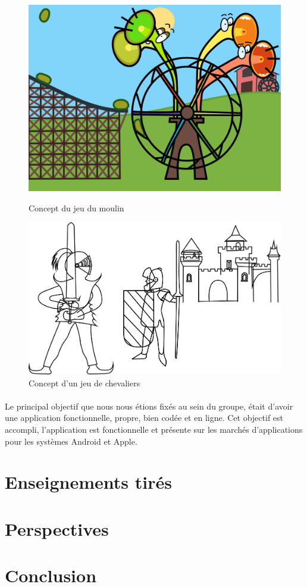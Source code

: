 \begin{figure}[H]\centering
   \begin{minipage}{0.49\textwidth}\centering
     \includegraphics[scale=0.1]{./img/concept_moulin.png}
     \caption{Concept du jeu du moulin}
     \label{jeu_concept1}
   \end{minipage}
   \begin {minipage}{0.49\textwidth}\centering
     \includegraphics[scale=0.1]{./img/concept_chevalier.png}
     \caption{Concept d'un jeu de chevaliers}
     \label{jeu_concept2}
   \end{minipage}
\end{figure}

\paragraph{}
Le principal objectif que nous nous étions fixés au sein du groupe, était d'avoir une application fonctionnelle, propre, bien codée et en ligne. Cet objectif est accompli, l'application est fonctionnelle et présente sur les marchés d'applications pour les systèmes Android et Apple.

\section{Enseignements tirés}


\section{Perspectives}


\section{Conclusion}

